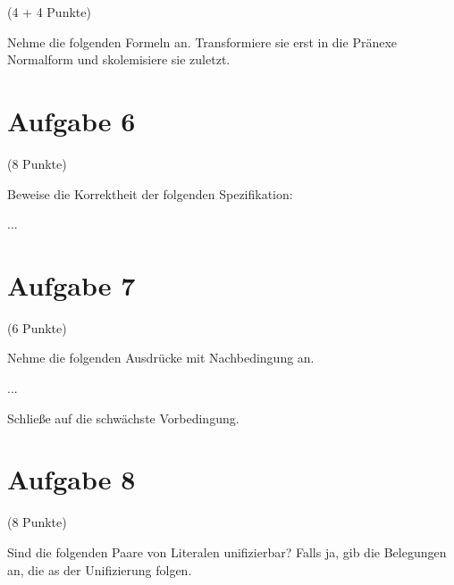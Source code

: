 \documentclass{exam}
\newcommand{\Punkte}[1]{\begin{flushright}(#1 Punkte)\end{flushright}}
\begin{document}
	\Punkte{4 + 4}
	
	Nehme die folgenden Formeln an. Transformiere sie erst in die Pränexe Normalform und skolemisiere sie zuletzt.
	
	
	
	\clearpage
	\section{Aufgabe 6}
	\Punkte{8}
	
	Beweise die Korrektheit der folgenden Spezifikation:
	
	...
	
	
	\clearpage
	\section{Aufgabe 7}
	\Punkte{6}
	
	
	Nehme die folgenden Ausdrücke mit Nachbedingung an.
	
	...
	
	Schließe auf die schwächste Vorbedingung.
	
	
	\clearpage
	\section{Aufgabe 8}
	\Punkte{8}
	
	Sind die folgenden Paare von Literalen unifizierbar? Falls ja, gib die  Belegungen an, die as der Unifizierung folgen.
		
\end{document}
